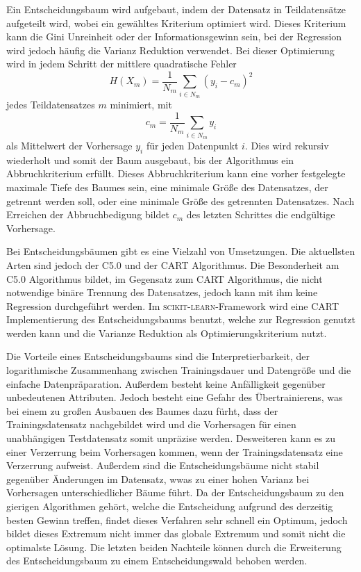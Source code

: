 Ein Entscheidungsbaum wird aufgebaut, indem der Datensatz in Teildatensätze aufgeteilt wird, wobei ein gewähltes Kriterium optimiert wird.
Dieses Kriterium
kann die Gini Unreinheit oder der Informationsgewinn sein, bei der Regression wird jedoch häufig die Varianz Reduktion verwendet.
Bei dieser Optimierung wird in jedem Schritt der mittlere quadratische Fehler
\begin{equation}
  H(X_m) = \frac{1}{N_m}\sum_{i\in N_m}(y_i-c_m)^2
\end{equation}
jedes Teildatensatzes $m$ minimiert, mit
\begin{equation}
  c_m = \frac{1}{N_m}\sum_{i\in N_m}y_i
\end{equation}
als Mittelwert der Vorhersage $y_i$ für jeden Datenpunkt $i$.
Dies wird rekursiv wiederholt und somit der Baum ausgebaut, bis der Algorithmus ein Abbruchkriterium erfüllt.
Dieses Abbruchkriterium kann eine vorher festgelegte maximale Tiefe
des Baumes sein, eine minimale Größe des Datensatzes, der getrennt werden soll, oder eine minimale Größe des getrennten Datensatzes. Nach Erreichen der Abbruchbedigung bildet
$c_m$ des letzten Schrittes die endgültige Vorhersage.

Bei Entscheidungsbäumen gibt es eine Vielzahl von Umsetzungen.
Die aktuellsten Arten sind jedoch der C5.0 und der CART Algorithmus\cite[1]{CART}.
Die Besonderheit am C5.0 Algorithmus bildet, im Gegensatz zum CART Algorithmus, die nicht notwendige binäre Trennung des Datensatzes,
jedoch kann mit ihm keine Regression durchgeführt werden.
Im \textsc{scikit-learn}-Framework\cite{scikit-learn} wird eine CART Implementierung des Entscheidungsbaums benutzt, welche zur
Regression genutzt werden kann und die Varianze Reduktion als Optimierungskriterium nutzt.

Die Vorteile eines Entscheidungsbaums sind die Interpretierbarkeit, der logarithmische Zusammenhang zwischen Trainingsdauer und Datengröße und die einfache Datenpräparation.
Außerdem besteht keine Anfälligkeit gegenüber unbedeutenen Attributen.
Jedoch besteht eine Gefahr des Übertrainierens, was bei einem zu großen Ausbauen des Baumes dazu fürht, dass der Trainingsdatensatz nachgebildet
wird und die Vorhersagen für einen unabhängigen Testdatensatz somit unpräzise werden.
Desweiteren kann es zu einer Verzerrung beim Vorhersagen kommen, wenn der Trainingsdatensatz eine Verzerrung aufweist.
Außerdem sind die Entscheidungsbäume nicht stabil gegenüber Änderungen im Datensatz, wwas zu einer hohen Varianz bei Vorhersagen
unterschiedlicher Bäume führt.
Da der Entscheidungsbaum zu den gierigen Algorithmen gehört, welche die Entscheidung aufgrund des derzeitig besten Gewinn treffen, findet dieses Verfahren sehr schnell ein
Optimum, jedoch bildet dieses Extremum nicht immer das globale Extremum und somit nicht die optimalste Lösung.
Die letzten beiden Nachteile können durch die Erweiterung des Entscheidungsbaum zu einem Entscheidungswald behoben werden.

